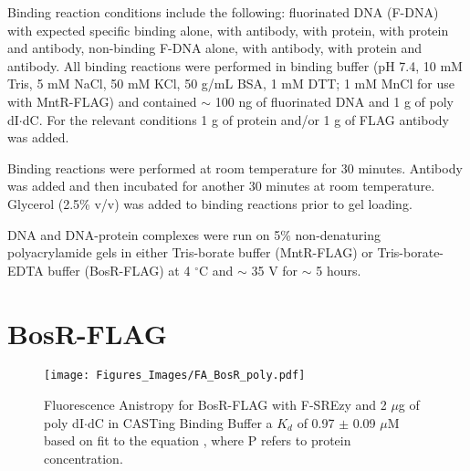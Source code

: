 \documentclass[12pt,twoside]{reedthesis}
\begin{document}
Binding reaction conditions include the following: fluorinated DNA (F-DNA) with expected specific binding alone, with antibody, with protein, with protein and antibody, non-binding F-DNA alone, with antibody, with protein and antibody. All binding reactions were performed in binding buffer (pH 7.4, 10 mM Tris, 5 mM NaCl, 50 mM KCl, 50 \micro g/mL BSA, 1 mM DTT; 1 mM MnCl for use with MntR-FLAG) and contained $\sim$ 100 ng of fluorinated DNA and 1 \micro g of poly dI$\cdot$dC. For the relevant conditions 1 \micro g of protein and/or 1 \micro g of FLAG antibody was added.

Binding reactions were performed at room temperature for 30 minutes. Antibody was added and then incubated for another 30 minutes at room temperature. Glycerol (2.5\% v/v) was added to binding reactions prior to gel loading. 

DNA and DNA-protein complexes were run on 5\% non-denaturing polyacrylamide gels in either Tris-borate buffer (MntR-FLAG) or Tris-borate-EDTA buffer (BosR-FLAG) at 4 $^\circ$C and $\sim$ 35 V for $\sim$ 5 hours. 
  
 

   
  
  
  \section{BosR-FLAG}
  
         	\begin{figure}[h]
         		\centering
         		\texttt{[image: Figures\_Images/FA\_BosR\_poly.pdf]}
         		\caption[Determining DNA Activity of BosR-FLAG by Fluorescence Anistropy]{Fluorescence Anistropy for BosR-FLAG with F-SREzy and 2 $\mu$g of poly dI$\cdot$dC in CASTing Binding Buffer  a $K_{d}$ of 0.97 $\pm$ 0.09 $\mu$M based on fit to the equation \FAstdfit , where P refers to protein concentration.}
         		\label{BosRFLAGFApoly}
         	\end{figure}
  
\end{document}
